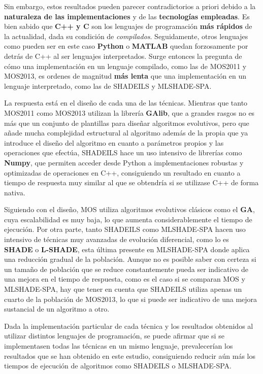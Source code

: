 Sin embargo, estos resultados pueden parecer contradictorios a priori debido a la \textbf{naturaleza de las implementaciones} y de las \textbf{tecnologías empleadas}. Es bien sabido que \textbf{C++ y C} son los lenguajes de programación \textbf{más rápidos} de la actualidad, dada su condición de \textit{compilados}. Seguidamente, otros lenguajes como pueden ser en este caso \textbf{Python} o \textbf{MATLAB} quedan forzosamente por detrás de C++ al ser lenguajes interpretados. Surge entonces la pregunta de cómo una implementación en un lenguaje compilado, como las de MOS2011 y MOS2013, es ordenes de magnitud \textbf{más lenta} que una implementación en un lenguaje interpretado, como las de SHADEILS y MLSHADE-SPA.

La respuesta está en el diseño de cada una de las técnicas. Mientras que tanto MOS2011 como MOS2013 utilizan la librería \textbf{GAlib}, que a grandes rasgos no es más que un conjunto de plantillas para diseñar algoritmos evolutivos, pero que añade mucha complejidad estructural al algoritmo además de la propia que ya introduce el diseño del algoritmo en cuanto a parámetros propios y las operaciones que efectúa, SHADEILS hace un uso intensivo de librerías como \textbf{Numpy}, que permiten acceder desde Python a implementaciones robustas y optimizadas de operaciones en C++, consiguiendo un resultado en cuanto a tiempo de respuesta muy similar al que se obtendría si se utilizase C++ de forma nativa.

Siguiendo con el diseño, MOS utiliza algoritmos evolutivos clásicos como el \textbf{GA}, cuya escalabilidad es muy baja, lo que aumenta considerablemente el tiempo de ejecución. Por otra parte, tanto SHADEILS como MLSHADE-SPA hacen uso intensivo de técnicas muy avanzadas de evolución diferencial, como lo es \textbf{SHADE} o \textbf{L-SHADE}, esta última presente en MLSHADE-SPA donde aplica una reducción gradual de la población. Aunque no es posible saber con certeza si un tamaño de población que se reduce constantemente pueda ser indicativo de una mejora en el tiempo de respuesta, como es el caso si se comparan MOS y MLSHADE-SPA, hay que tener en cuenta que SHADEILS utiliza apenas un cuarto de la población de MOS2013, lo que si puede ser indicativo de una mejora sustancial de un algoritmo a otro.

Dada la implementación particular de cada técnica y los resultados obtenidos al utilizar distintos lenguajes de programación, se puede afirmar que si se implementasen todas las técnicas en un mismo lenguaje, prevalecerían los resultados que se han obtenido en este estudio, consiguiendo reducir aún más los tiempos de ejecución de algoritmos como SHADEILS o MLSHADE-SPA. 

